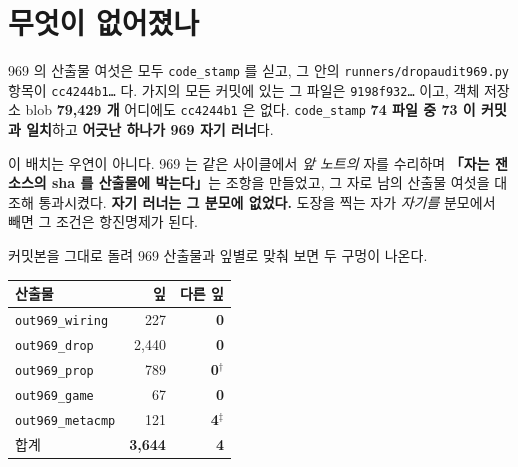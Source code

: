 \documentclass[10pt]{article}
\begin{document}
\section{무엇이 없어졌나}


969 의 산출물 여섯은 모두 \texttt{code\_stamp} 를 싣고, 그 안의
\texttt{runners/dropaudit969.py} 항목이 \texttt{cc4244b1\ldots} 다. 가지의 모든 커밋에
있는 그 파일은 \texttt{9198f932\ldots} 이고, 객체 저장소 blob \textbf{79{,}429 개} 어디에도
\texttt{cc4244b1} 은 없다. \texttt{code\_stamp} \textbf{74 파일 중 73 이 커밋과 일치}하고
\textbf{어긋난 하나가 969 자기 러너}다.

이 배치는 우연이 아니다. 969 는 같은 사이클에서 \emph{앞 노트의} 자를 수리하며
\textbf{「자는 잰 소스의 sha 를 산출물에 박는다」}는 조항을 만들었고, 그 자로 남의 산출물
여섯을 대조해 통과시켰다. \textbf{자기 러너는 그 분모에 없었다.} 도장을 찍는 자가
\emph{자기를} 분모에서 빼면 그 조건은 항진명제가 된다.


커밋본을 그대로 돌려 969 산출물과 잎별로 맞춰 보면 두 구멍이 나온다.

\begin{center}\small
\begin{tabular}{lrr}
산출물 & 잎 & \textbf{다른 잎} \\
\hline
\texttt{out969\_wiring} & 227 & \textbf{0} \\
\texttt{out969\_drop} & 2{,}440 & \textbf{0} \\
\texttt{out969\_prop} & 789 & \textbf{0}$^\dagger$ \\
\texttt{out969\_game} & 67 & \textbf{0} \\
\texttt{out969\_metacmp} & 121 & \textbf{4}$^\ddagger$ \\
\hline
합계 & \textbf{3{,}644} & \textbf{4} \\
\end{tabular}
\end{center}

\end{document}
